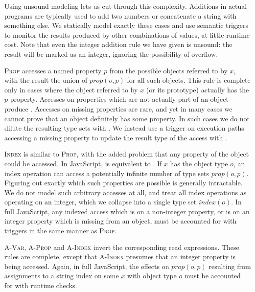 Using unsound modeling lets us cut through this complexity.
Additions in actual programs are typically used to add two numbers
or concatenate a string with something else.
We statically model exactly these cases
and use semantic triggers to monitor the results produced by other
combinations of values, at little runtime cost.
Note that even the integer addition rule we have given is unsound: the
result will be marked as an integer, ignoring the possibility of
overflow.

\textsc{Prop} accesses a named property $p$ from the possible objects referred
to by $x$, with the result the union of $\mathit{prop}(o,p)$ for all such
objects.  This rule is complete only in cases where the object referred to by
$x$ (or its prototype) actually has the $p$ property. Accesses on properties
which are not actually part of an object produce .
Accesses on missing properties are rare,
and yet in many cases we cannot prove that an object
definitely has some property. In such cases we do not dilute the
resulting type sets with . We instead use a trigger
on execution paths accessing a missing property to update the result type
of the access with .

\textsc{Index} is similar to \textsc{Prop}, with the added problem that any
property of the object could be accessed.  In JavaScript,  is
equivalent to . If $x$ has the object type $o$, an index operation
can access a potentially infinite number of type sets $\mathit{prop}(o,p)$.
Figuring out exactly which such properties are possible is generally
intractable. We do not model such arbitrary accesses at all, and treat
all index operations as operating on an integer,
 which we collapse into a single type set
$\mathit{index}(o)$.  In full JavaScript, any indexed access which is on a
non-integer property, or is on an integer property which is missing from an
object, must be accounted for with triggers in the same manner as
\textsc{Prop}.

\textsc{A-Var}, \textsc{A-Prop} and \textsc{A-Index} invert the
corresponding read expressions.  These rules are complete, except that
\textsc{A-Index} presumes that an integer property is being accessed.
Again, in full JavaScript, the effects on $\mathit{prop}(o,p)$ resulting from
assignments to a string index  on some $x$ with object type $o$
must be accounted for with runtime checks.

